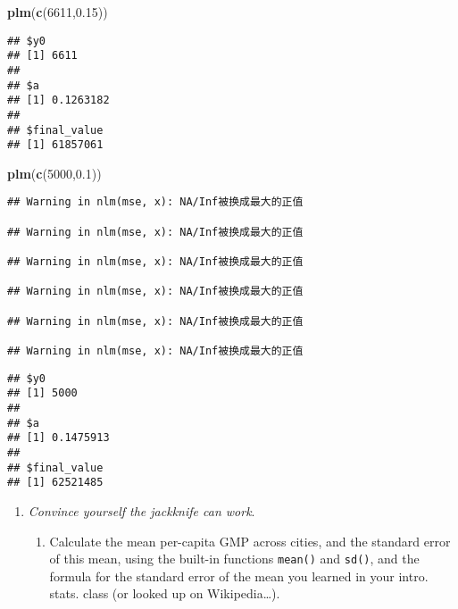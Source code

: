 \documentclass[
]{article}
\newenvironment{Shaded}{\begin{snugshade}}{\end{snugshade}}
\newcommand{\DecValTok}[1]{\textcolor[rgb]{0.00,0.00,0.81}{#1}}
\newcommand{\FloatTok}[1]{\textcolor[rgb]{0.00,0.00,0.81}{#1}}
\newcommand{\KeywordTok}[1]{\textcolor[rgb]{0.13,0.29,0.53}{\textbf{#1}}}
\newcommand{\NormalTok}[1]{#1}
\providecommand{\tightlist}{%
  \setlength{\itemsep}{0pt}\setlength{\parskip}{0pt}}
\begin{document}
\begin{Shaded}
\begin{Highlighting}[]
\KeywordTok{plm}\NormalTok{(}\KeywordTok{c}\NormalTok{(}\DecValTok{6611}\NormalTok{,}\FloatTok{0.15}\NormalTok{))}
\end{Highlighting}
\end{Shaded}

\begin{verbatim}
## $y0
## [1] 6611
## 
## $a
## [1] 0.1263182
## 
## $final_value
## [1] 61857061
\end{verbatim}

\begin{Shaded}
\begin{Highlighting}[]
\KeywordTok{plm}\NormalTok{(}\KeywordTok{c}\NormalTok{(}\DecValTok{5000}\NormalTok{,}\FloatTok{0.1}\NormalTok{))}
\end{Highlighting}
\end{Shaded}

\begin{verbatim}
## Warning in nlm(mse, x): NA/Inf被换成最大的正值

## Warning in nlm(mse, x): NA/Inf被换成最大的正值

## Warning in nlm(mse, x): NA/Inf被换成最大的正值

## Warning in nlm(mse, x): NA/Inf被换成最大的正值

## Warning in nlm(mse, x): NA/Inf被换成最大的正值

## Warning in nlm(mse, x): NA/Inf被换成最大的正值
\end{verbatim}

\begin{verbatim}
## $y0
## [1] 5000
## 
## $a
## [1] 0.1475913
## 
## $final_value
## [1] 62521485
\end{verbatim}

\begin{enumerate}
\def\labelenumi{\arabic{enumi}.}
\setcounter{enumi}{4}
\tightlist
\item
  \emph{Convince yourself the jackknife can work}.

  \begin{enumerate}
  \def\labelenumii{\alph{enumii}.}
  \tightlist
  \item
    Calculate the mean per-capita GMP across cities, and the standard
    error of this mean, using the built-in functions \texttt{mean()} and
    \texttt{sd()}, and the formula for the standard error of the mean
    you learned in your intro. stats. class (or looked up on
    Wikipedia\ldots).
  \end{enumerate}
\end{enumerate}
\end{document}
